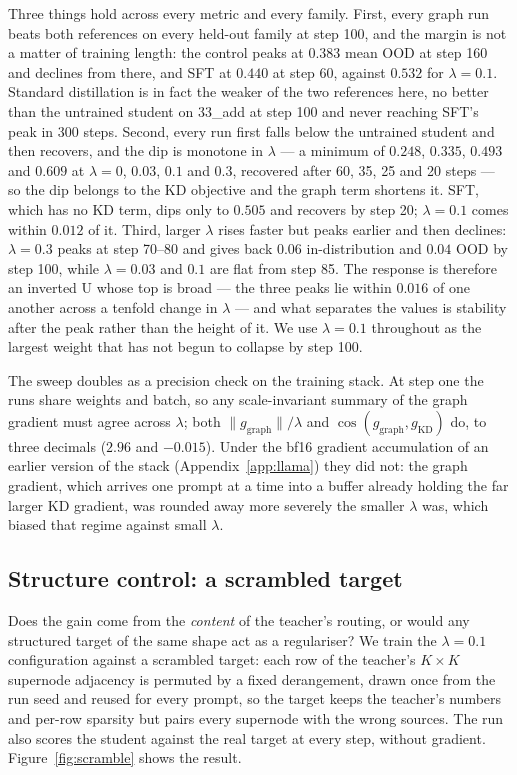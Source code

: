\documentclass{article}
\begin{document}
Three things hold across every metric and every family. First, every graph run beats both
references on every held-out family at step 100, and the margin is not a matter of training
length: the control peaks at $0.383$ mean OOD at step 160 and declines from there, and SFT at
$0.440$ at step 60, against $0.532$ for $\lambda = 0.1$. Standard distillation is in fact the
weaker of the two references here, no better than the untrained student on 33\_add at step 100 and
never reaching SFT's peak in 300 steps. Second, every run first falls below the untrained student
and then recovers, and the dip is monotone in $\lambda$ --- a minimum of $0.248$, $0.335$,
$0.493$ and $0.609$ at $\lambda = 0$, $0.03$, $0.1$ and $0.3$, recovered after 60, 35, 25 and 20
steps --- so the dip belongs to the KD objective and the graph term shortens it. SFT, which has
no KD term, dips only to $0.505$ and recovers by step 20; $\lambda = 0.1$ comes within $0.012$ of
it. Third,
larger $\lambda$ rises faster but peaks earlier and then declines: $\lambda = 0.3$ peaks at step
70--80 and gives back $0.06$ in-distribution and $0.04$ OOD by step 100, while $\lambda = 0.03$
and $0.1$ are flat from step 85. The response is therefore an inverted U whose top is broad ---
the three peaks lie within $0.016$ of one another across a tenfold change in $\lambda$ --- and
what separates the values is stability after the peak rather than the height of it. We use
$\lambda = 0.1$ throughout as the largest weight that has not begun to collapse by step 100.

The sweep doubles as a precision check on the training stack. At step one the runs share weights
and batch, so any scale-invariant summary of the graph gradient must agree across $\lambda$; both
$\|g_{\mathrm{graph}}\| / \lambda$ and $\cos(g_{\mathrm{graph}}, g_{\mathrm{KD}})$ do, to three
decimals ($2.96$ and $-0.015$). Under the bf16 gradient accumulation of an earlier version of the
stack (Appendix~\ref{app:llama}) they did not: the graph gradient, which arrives one prompt at a
time into a buffer already holding the far larger KD gradient, was rounded away more severely the
smaller $\lambda$ was, which biased that regime against small $\lambda$.

\subsection{Structure control: a scrambled target}
\label{sec:scramble}

Does the gain come from the \emph{content} of the teacher's routing, or would any structured
target of the same shape act as a regulariser? We train the $\lambda = 0.1$ configuration against
a scrambled target: each row of the teacher's $K \times K$ supernode adjacency is permuted by a
fixed derangement, drawn once from the run seed and reused for every prompt, so the target keeps
the teacher's numbers and per-row sparsity but pairs every supernode with the wrong sources. The
run also scores the student against the real target at every step, without gradient.
Figure~\ref{fig:scramble} shows the result.
\end{document}
